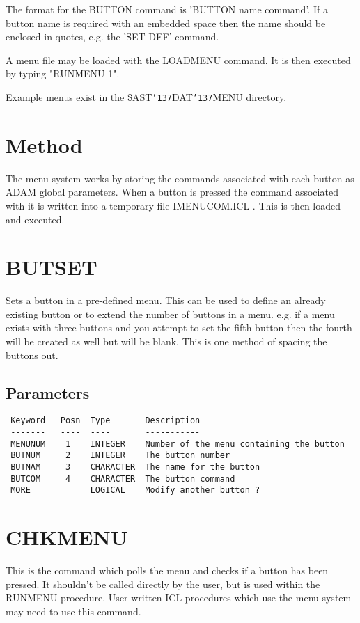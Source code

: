 \documentclass{book}
\renewcommand{\_}{{\tt\char'137}}     %
\begin{document}
The format for the BUTTON command is 'BUTTON name command'. If a button
name is required with an embedded space then the name should be enclosed
in quotes, e.g. the 'SET DEF' command.

A menu file may be loaded with the LOADMENU command. It is then executed
by typing "RUNMENU 1".

Example menus exist in the \$AST\_DAT\_MENU directory.

\section{Method}
The menu system works by storing the commands associated with each
button as ADAM global parameters. When a button is pressed the command
associated with it is written into a temporary file IMENUCOM.ICL .
This is then loaded and executed.

\section{BUTSET}
Sets a button in a pre-defined menu. This can be used to define an
already existing button or to extend the number of buttons in a menu.
e.g. if a menu exists with three buttons and you attempt to set the fifth
button then the fourth will be created as well but will be blank. This
is one method of spacing the buttons out.

\subsection{Parameters}
\begin{verbatim}
 Keyword   Posn  Type       Description
 -------   ----  ----       -----------
 MENUNUM    1    INTEGER    Number of the menu containing the button
 BUTNUM     2    INTEGER    The button number
 BUTNAM     3    CHARACTER  The name for the button
 BUTCOM     4    CHARACTER  The button command
 MORE            LOGICAL    Modify another button ?

\end{verbatim}\section{CHKMENU}
This is the command which polls the menu and checks if a button has
been pressed. It shouldn't be called directly by the user, but is used
within the RUNMENU procedure. User written ICL procedures which use
the menu system may need to use this command.
\end{document}
